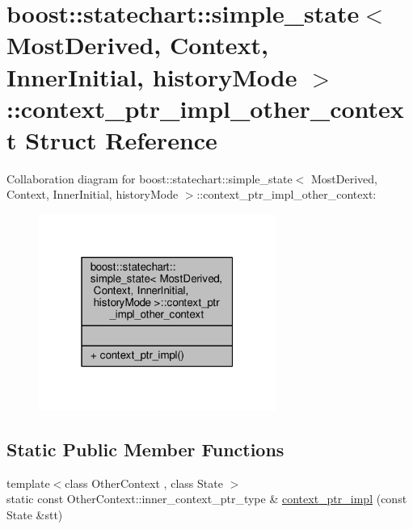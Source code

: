 \hypertarget{structboost_1_1statechart_1_1simple__state_1_1context__ptr__impl__other__context}{}\section{boost\+:\+:statechart\+:\+:simple\+\_\+state$<$ Most\+Derived, Context, Inner\+Initial, history\+Mode $>$\+:\+:context\+\_\+ptr\+\_\+impl\+\_\+other\+\_\+context Struct Reference}
\label{structboost_1_1statechart_1_1simple__state_1_1context__ptr__impl__other__context}


Collaboration diagram for boost\+:\+:statechart\+:\+:simple\+\_\+state$<$ Most\+Derived, Context, Inner\+Initial, history\+Mode $>$\+:\+:context\+\_\+ptr\+\_\+impl\+\_\+other\+\_\+context\+:
\nopagebreak
\begin{figure}[H]
\begin{center}
\leavevmode
\includegraphics[width=220pt]{structboost_1_1statechart_1_1simple__state_1_1context__ptr__impl__other__context__coll__graph}
\end{center}
\end{figure}
\subsection*{Static Public Member Functions}
\begin{DoxyCompactItemize}
\item 
{\footnotesize template$<$class Other\+Context , class State $>$ }\\static const Other\+Context\+::inner\+\_\+context\+\_\+ptr\+\_\+type \& \mbox{\hyperlink{structboost_1_1statechart_1_1simple__state_1_1context__ptr__impl__other__context_a9fc63a5c8666fcb7e28b5f6cbfa62623}{context\+\_\+ptr\+\_\+impl}} (const State \&stt)
\end{DoxyCompactItemize}


